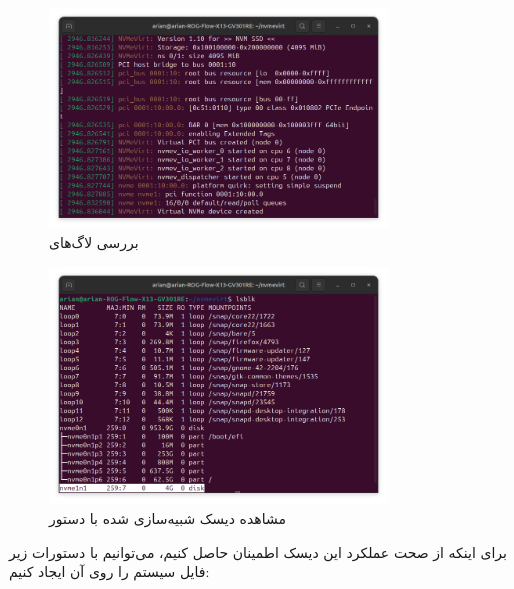 \documentclass[12pt]{article}
\begin{document}
\begin{figure}[H]
    \centering
    \includegraphics[width=0.8\textwidth]{2.png}
    \caption{بررسی لاگ‌های }
\end{figure}

\begin{figure}[H]
    \centering
    \includegraphics[width=0.8\textwidth]{3.png}
    \caption{مشاهده دیسک شبیه‌سازی شده با دستور }
\end{figure}

برای اینکه از صحت عملکرد این دیسک اطمینان حاصل کنیم، می‌توانیم با دستورات زیر فایل سیستم را روی آن ایجاد کنیم:\\

\\

\\

\\

\\
\end{document}
